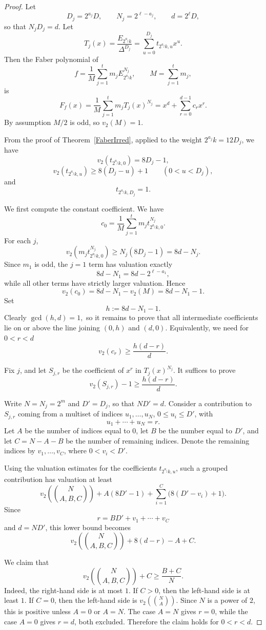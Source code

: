 \documentclass[12pt]{amsart}
\begin{document}
\begin{proof}
Let
\[ D_j=2^{a_j}D,\qquad N_j=2^{\ell-a_j},\qquad d=2^\ell D, \]
so that $N_jD_j=d$. Let
\[ T_j(x)=\frac{E_{2^{a_j}k}}{\Delta^{D_j}} =\sum_{u=0}^{D_j} t_{2^{a_j}k,u}x^u. \]
Then the Faber polynomial of
\[
f=\frac{1}{M}\sum_{j=1}^t m_jE_{2^{a_j}k}^{N_j},
\qquad M=\sum_{j=1}^t m_j,
\]
is
\[
F_f(x)=\frac{1}{M}\sum_{j=1}^t m_j T_j(x)^{N_j}
      =x^d+\sum_{r=0}^{d-1}c_rx^r.
\]
By assumption $M/2$ is odd, so $v_2(M)=1$.

From the proof of Theorem~\ref{FaberIrred}, applied to the weight
$2^{a_j}k=12D_j$, we have
\[ v_2(t_{2^{a_j}k,0})=8D_j-1, \]
\[ v_2(t_{2^{a_j}k,u})\ge 8(D_j-u)+1 \qquad (0<u<D_j),
\]
and
\[ t_{2^{a_j}k,D_j}=1. \]

We first compute the constant coefficient. We have
\[
c_0=\frac{1}{M}\sum_{j=1}^t m_jt_{2^{a_j}k,0}^{N_j}.
\]
For each \(j\),
\[
v_2\left(m_jt_{2^{a_j}k,0}^{N_j}\right)
\ge
N_j(8D_j-1)=8d-N_j.
\]
Since $m_1$ is odd, the \(j=1\) term has valuation exactly
\[
8d-N_1=8d-2^{\ell-a_1},
\]
while all other terms have strictly larger valuation. Hence
\[
v_2(c_0)=8d-N_1-v_2(M)=8d-N_1-1.
\]
Set
\[ h:=8d-N_1-1. \]
Clearly $\gcd(h,d)=1,$ so it remains to prove that all intermediate coefficients lie on or above the
line joining \((0,h)\) and \((d,0)\). Equivalently, we need for $0<r<d$
\[ v_2(c_r)\ge \frac{h(d-r)}{d}.  \]

Fix $j$, and let $S_{j,r}$ be the coefficient of $x^r$ in
$T_j(x)^{N_j}$. It suffices to prove
\[ v_2(S_{j,r})-1\ge \frac{h(d-r)}{d}.  \]


Write $N=N_j=2^m$ and $D'=D_j$, so that $ND'=d$. Consider a contribution
to $S_{j,r}$ coming from a multiset of indices $u_1,\ldots,u_N$, $0\le u_i\le D'$,  with
\[ u_1+\cdots+u_N=r. \]
Let $A$ be the number of indices equal to $0$, let $B$ be the number
equal to $D'$, and let $C=N-A-B$ be the number of remaining indices. Denote
the remaining indices by $v_1,\ldots,v_C$, where $0<v_i<D'$.

Using the valuation estimates for the coefficients $t_{2^{a_j}k,u}$, such a
grouped contribution has valuation at least
\[ 
v_2\left(\binom{N}{A,B,C}\right) + A(8D'-1) + \sum_{i=1}^C \bigl(8(D'-v_i)+1\bigr).
\]
Since
\[
r=BD'+v_1+\cdots+v_C
\]
and $d=ND'$, this lower bound becomes
\[
v_2\left(\binom{N}{A,B,C}\right)+8(d-r)-A+C.
\]

We claim that
\[
v_2\left(\binom{N}{A,B,C}\right)+C\ge \frac{B+C}{N}.
\]
Indeed, the right-hand side is at most $1$. If $C>0$, then the left-hand
side is at least $1$. If $C=0$, then the left-hand side is
$v_2\left(\binom{N}{A}\right)$. Since $N$ is a power of $2$, this is positive unless
$A=0$ or $A=N$. The case $A=N$ gives $r=0$, while the case $A=0$
gives $r=d$, both excluded. Therefore the claim holds for $0<r<d$.


\end{proof}
\end{document}
